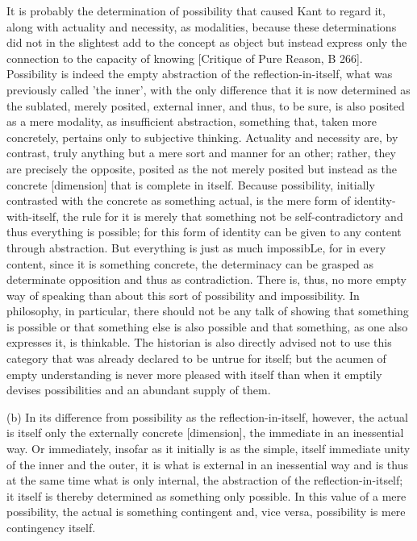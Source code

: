     It is probably the determination of possibility that caused
    Kant to regard it, along with actuality and necessity, as modalities,
    because these determinations did not in the slightest add to the concept
    as object but instead express only the connection to the
    capacity of knowing [Critique of Pure Reason, B 266].
    Possibility is indeed the empty abstraction of the reflection-in-itself,
    what was previously called 'the inner', with the only difference that
    it is now determined as the sublated, merely posited, external inner,
    and thus, to be sure, is also posited as a mere modality,
    as insufficient abstraction, something that, taken more concretely,
    pertains only to subjective thinking.
    Actuality and necessity are, by contrast, truly
    anything but a mere sort and manner for an other; rather, they are
    precisely the opposite, posited as the not merely posited but instead
    as the concrete [dimension] that is complete in itself.
    Because possibility, initially contrasted with
    the concrete as something actual,
    is the mere form of identity-with-itself,
    the rule for it is merely that something not be self-contradictory and
    thus everything is possible;
    for this form of identity can be given to any content through abstraction.
    But everything is just as much impossibLe, for in
    every content, since it is something concrete, the determinacy can
    be grasped as determinate opposition and thus as contradiction.
    There is, thus, no more empty way of speaking than about this sort
    of possibility and impossibility.
    In philosophy, in particular, there should not be any talk of showing that
    something is possible or that something else is also possible and
    that something, as one also expresses it, is thinkable.
    The historian is also directly advised not to use this
    category that was already declared to be untrue for itself;
    but the acumen of empty understanding is never more pleased with itself
    than when it emptily devises possibilities and an abundant supply of them.

(b) In its difference from possibility as the reflection-in-itself, however,
the actual is itself only the externally concrete [dimension],
the immediate in an inessential way.
Or immediately, insofar as it initially is as the simple,
itself immediate unity of the inner and the outer,
it is what is external in an inessential way and
is thus at the same time what is only internal,
the abstraction of the reflection-in-itself;
it itself is thereby determined as something only possible.
In this value of a mere possibility, the actual is something contingent and,
vice versa, possibility is mere contingency itself.

